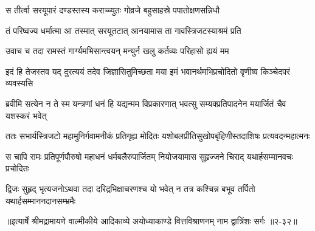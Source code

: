 \twolineshloka
{स तीर्त्वा सरयूपारं दण्डस्तस्य कराच्च्युतः}
{गोव्रजे बहुसाहस्रे पपातोक्षणसन्निधौ} %

\twolineshloka
{तं परिष्वज्य धर्मात्मा आ तस्मात् सरयूतटात्}
{आनयामास ता गावस्त्रिजटस्याश्रमं प्रति} %

\twolineshloka
{उवाच च तदा रामस्तं गार्ग्यमभिसान्त्वयन्}
{मन्युर्न खलु कर्तव्यः परिहासो ह्ययं मम} %

\twolineshloka
{इदं हि तेजस्तव यद् दुरत्ययं तदेव जिज्ञासितुमिच्छता मया}
{इमं भवानर्थमभिप्रचोदितो वृणीष्व किञ्चेदपरं व्यवस्यसि} %

\twolineshloka
{ब्रवीमि सत्येन न ते स्म यन्त्रणां धनं हि यद्यन्मम विप्रकारणात्}
{भवत्सु सम्यक्प्रतिपादनेन मयार्जितं चैव यशस्करं भवेत्} %

\twolineshloka
{ततः सभार्यस्त्रिजटो महामुनिर्गवामनीकं प्रतिगृह्य मोदितः}
{यशोबलप्रीतिसुखोपबृंहिणीस्तदाशिषः प्रत्यवदन्महात्मनः} %

\twolineshloka
{स चापि रामः प्रतिपूर्णपौरुषो महाधनं धर्मबलैरुपार्जितम्}
{नियोजयामास सुहृज्जने चिराद् यथार्हसम्मानवचः प्रचोदितः} %

\twolineshloka
{द्विजः सुहृद् भृत्यजनोऽथवा तदा दरिद्रभिक्षाचरणश्च यो भवेत्}
{न तत्र कश्चिन्न बभूव तर्पितो यथार्हसम्माननदानसम्भ्रमैः} %


॥इत्यार्षे श्रीमद्रामायणे वाल्मीकीये आदिकाव्ये अयोध्याकाण्डे वित्तविश्राणनम् नाम द्वात्रिंशः सर्गः ॥२-३२॥
